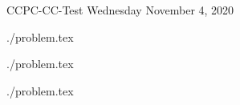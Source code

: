 \documentclass [11pt, a4paper, oneside] {article}
\begin{document}
\contest
{CCPC-CC-Test}%
{Wednesday }%
{November 4, 2020}%


\renewcommand{\t}{\texttt}

\graphicspath{{./AA/}}
{./problem.tex}

\graphicspath{{./BB/}}
{./problem.tex}

\graphicspath{{./CC/}}
{./problem.tex}








\end{document}
